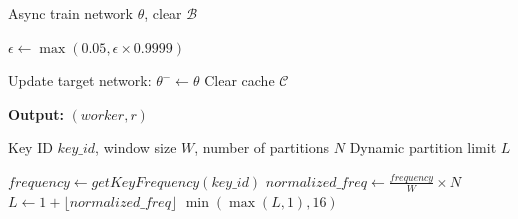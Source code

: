 \documentclass[11pt]{article}
\begin{document}
\begin{algorithm}[H]
\begin{algorithmic}[1]
        \STATE Async train network $\theta$, clear $\mathcal{B}$
    \ENDIF
    
    \STATE $\epsilon \gets \max(0.05, \epsilon \times 0.9999)$
    
        \STATE Update target network: $\theta^- \gets \theta$
        \STATE Clear cache $\mathcal{C}$
    \ENDIF
    
    \STATE \textbf{Output:} $(worker, r)$
\ENDFOR

\end{algorithmic}
\end{algorithm}

\begin{algorithm}[H]
\caption{Calculate Dynamic Partition Limit}
\begin{algorithmic}[1]
\REQUIRE Key ID $key\_id$, window size $W$, number of partitions $N$
\ENSURE Dynamic partition limit $L$

\STATE $frequency \gets getKeyFrequency(key\_id)$
\STATE $normalized\_freq \gets \frac{frequency}{W} \times N$
\STATE $L \gets 1 + \lfloor normalized\_freq \rfloor$
\RETURN $\min(\max(L, 1), 16)$
\end{algorithmic}
\end{algorithm}
\end{document}
